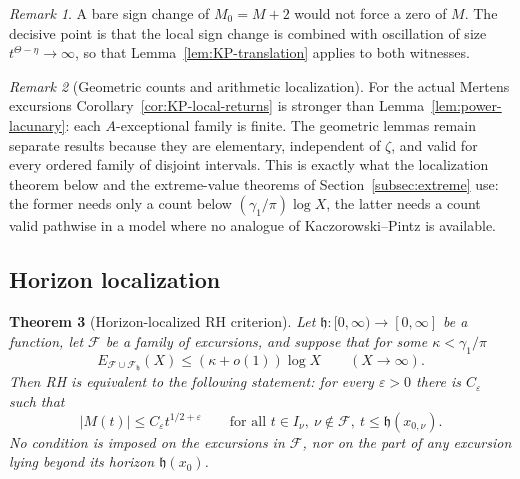 \documentclass[11pt]{amsart}
\numberwithin{equation}{section}
\theoremstyle{plain}
\newtheorem{theorem}{Theorem}[section]
\theoremstyle{definition}
\theoremstyle{remark}
\newtheorem{remark}[theorem]{Remark}
\newcommand{\eps}{\varepsilon}
\newcommand{\F}{\mathcal{F}}
\begin{document}
\begin{remark}
A bare sign change of $M_0=M+2$ would not force a zero of $M$. The
decisive point is that the local sign change is combined with oscillation of
size $t^{\Theta-\eta}\to\infty$, so that Lemma~\ref{lem:KP-translation}
applies to both witnesses.
\end{remark}

\begin{remark}[Geometric counts and arithmetic localization]
\label{rem:geom-vs-arith}
For the actual Mertens excursions Corollary~\ref{cor:KP-local-returns} is
stronger than Lemma~\ref{lem:power-lacunary}: each $A$-exceptional family is
finite. The geometric lemmas remain separate results because they are
elementary, independent of $\zeta$, and valid for every ordered family of
disjoint intervals. This is exactly what the localization theorem below and
the extreme-value theorems of Section~\ref{subsec:extreme} use: the former
needs only a count below $(\gamma_1/\pi)\log X$, the latter needs a count
valid pathwise in a model where no analogue of Kaczorowski--Pintz is
available.
\end{remark}

\subsection{Horizon localization}
\label{subsec:horizon}

\begin{theorem}[Horizon-localized RH criterion]
\label{thm:horizon}
\label{thm:sparse-RH}
Let $\mathfrak h:[0,\infty)\to[0,\infty]$ be a function, let $\F$ be a family
of excursions, and suppose that for some $\kappa<\gamma_1/\pi$
\begin{equation}
\label{eq:horizon-hyp}
E_{\F\cup\F_{\mathfrak h}}(X)\le(\kappa+o(1))\log X\qquad(X\to\infty).
\end{equation}
Then RH is equivalent to the following statement: for every $\eps>0$ there
is $C_\eps$ such that
\begin{equation}
\label{eq:restricted-RH}
|M(t)|\le C_\eps t^{1/2+\eps}
\qquad\text{for all }t\in I_\nu,\ \nu\notin\F,\ t\le \mathfrak h(x_{0,\nu}).
\end{equation}
No condition is imposed on the excursions in $\F$, nor on the part of any
excursion lying beyond its horizon $\mathfrak h(x_0)$.
\end{theorem}
\end{document}
